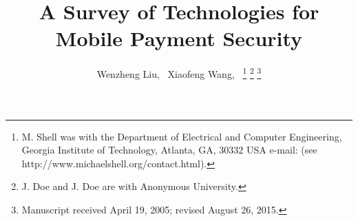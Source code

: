 \documentclass[journal]{IEEEtran}
\begin{document}
%
\title{A Survey of Technologies for Mobile Payment Security 
}
%
%
%

\author{Wenzheng Liu,~
        Xiaofeng Wang,~
\thanks{M. Shell was with the Department
of Electrical and Computer Engineering, Georgia Institute of Technology, Atlanta,
GA, 30332 USA e-mail: (see http://www.michaelshell.org/contact.html).}%
\thanks{J. Doe and J. Doe are with Anonymous University.}%
\thanks{Manuscript received April 19, 2005; revised August 26, 2015.}}

% 
%
\end{document}

